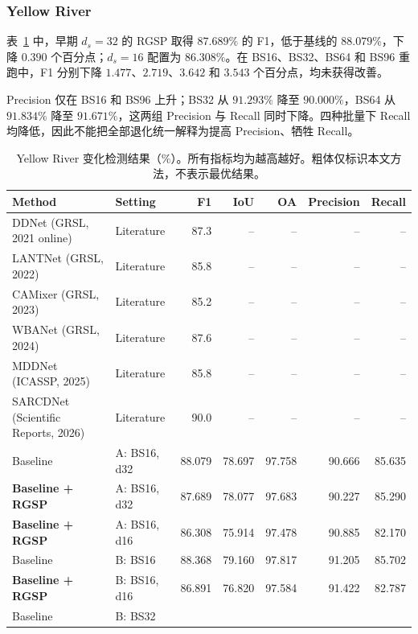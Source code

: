 \documentclass[journal]{IEEEtran}
\begin{document}
\subsubsection{Yellow River}
\label{sec:yellow_river_results}

表~\ref{tab:yellow_river_comparison} 中，早期 $d_s=32$ 的 RGSP 取得 $87.689\%$ 的 F1，低于基线的 $88.079\%$，下降 $0.390$ 个百分点；$d_s=16$ 配置为 $86.308\%$。在 BS16、BS32、BS64 和 BS96 重跑中，F1 分别下降 $1.477$、$2.719$、$3.642$ 和 $3.543$ 个百分点，均未获得改善。

Precision 仅在 BS16 和 BS96 上升；BS32 从 $91.293\%$ 降至 $90.000\%$，BS64 从 $91.834\%$ 降至 $91.671\%$，这两组 Precision 与 Recall 同时下降。四种批量下 Recall 均降低，因此不能把全部退化统一解释为提高 Precision、牺牲 Recall。

\begin{table}[!t]
\centering
\scriptsize
\setlength{\tabcolsep}{2pt}
\renewcommand{\arraystretch}{1.12}
\caption{Yellow River 变化检测结果（\%）。所有指标均为越高越好。粗体仅标识本文方法，不表示最优结果。}
\label{tab:yellow_river_comparison}
\begin{tabularx}{\linewidth}{@{}Xlrrrrr@{}}
\toprule
Method & Setting & F1 & IoU & OA & Precision & Recall \\
\midrule
DDNet (GRSL, 2021 online)
& Literature & 87.3 & -- & -- & -- & -- \\
LANTNet (GRSL, 2022)
& Literature & 85.8 & -- & -- & -- & -- \\
CAMixer (GRSL, 2023)
& Literature & 85.2 & -- & -- & -- & -- \\
WBANet (GRSL, 2024)
& Literature & 87.6 & -- & -- & -- & -- \\
MDDNet (ICASSP, 2025)
& Literature & 85.8 & -- & -- & -- & -- \\
SARCDNet (Scientific Reports, 2026)
& Literature & 90.0 & -- & -- & -- & -- \\
\midrule
Baseline
& A: BS16, d32
& 88.079 & 78.697 & 97.758 & 90.666 & 85.635 \\
\textbf{Baseline + RGSP}
& A: BS16, d32
& 87.689 & 78.077 & 97.683 & 90.227 & 85.290 \\
\textbf{Baseline + RGSP}
& A: BS16, d16
& 86.308 & 75.914 & 97.478 & 90.885 & 82.170 \\
\midrule
Baseline
& B: BS16
& 88.368 & 79.160 & 97.817 & 91.205 & 85.702 \\
\textbf{Baseline + RGSP}
& B: BS16, d16
& 86.891 & 76.820 & 97.584 & 91.422 & 82.787 \\
Baseline
& B: BS32

\end{tabularx}
\end{table}
\end{document}
